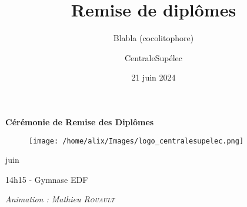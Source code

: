 \documentclass{beamer}
\title[Remise de diplômes]{Remise de diplômes}
\subtitle{Blabla (cocolitophore)}
\author{CentraleSupélec}
\institute{14h - Amphithéâtre Michelin}
\date{21 juin 2024}
\begin{document}
\begin{frame}[plain]
  \begin{center}
    \vspace*{0.5cm}
    {\Large \textbf{Cérémonie de Remise des Diplômes}} \\
    \vspace*{0.3cm}
    {\large 
    \begin{figure}
      \texttt{[image: /home/alix/Images/logo\_centralesupelec.png]}
    \end{figure}
    
    \vspace*{0.5cm}
     juin  \\
    }
    
    \vspace*{0.3cm}
    14h15 - Gymnase EDF \\
    \vspace*{0.7cm}
    
    \textit{ Animation : Mathieu \textsc{Rouault}}
  \end{center}

\end{frame}


\end{document}
